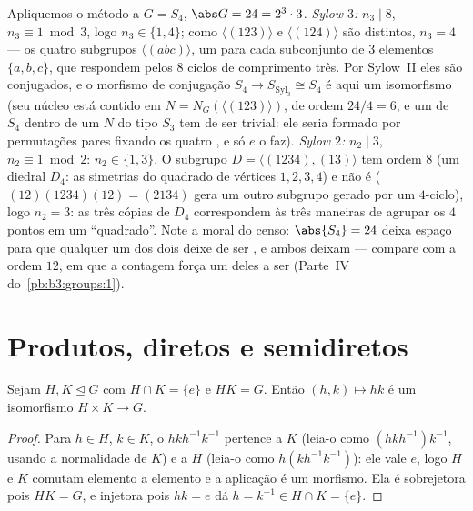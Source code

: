 \begin{example}
\label{ex:b3:groups:s4sylow}
Apliquemos o método a $G = S_4$, $\abs G = 24 = 2^3\cdot3$. \emph{Sylow $3$:} $n_3 \mid 8$, $n_3 \equiv 1 \bmod 3$,
logo $n_3
\in \{1, 4\}$; como $\langle(123)\rangle$ e $\langle(124)\rangle$ são distintos, $n_3 = 4$ --- os quatro
subgrupos $\langle(abc)\rangle$, um para cada subconjunto de $3$ elementos $\{a, b, c\}$,
que respondem pelos $8$ ciclos de comprimento três. Por
Sylow~II eles são conjugados, e o morfismo de conjugação $S_4 \to
S_{\mathrm{Syl}_3} \cong S_4$ é aqui
um isomorfismo (seu núcleo está contido em $N = N_G(\langle(123)\rangle)$, de ordem $24/4 =
6$, e um
 de $S_4$ dentro de um $N$ do tipo $S_3$ tem
de ser trivial: ele seria formado por permutações pares fixando os
quatro , e só $e$ o faz). \emph{Sylow $2$:}
$n_2 \mid 3$, $n_2
\equiv 1 \bmod 2$: $n_2 \in \{1, 3\}$. O subgrupo $D =
\langle(1234), (13)\rangle$ tem ordem $8$ (um diedral
$D_4$: as simetrias do quadrado de vértices $1, 2, 3, 4$) e não é 
($(12)(1234)(12) = (2134)$ gera um outro subgrupo gerado por um $4$-ciclo), logo $n_2 = 3$:
as três cópias de $D_4$ correspondem às três maneiras de agrupar os
$4$ pontos em um ``quadrado''. Note a moral do censo: $\abs{S_4} = 24$ deixa
espaço para que qualquer um dos dois  deixe de ser
, e ambos deixam --- compare com a ordem $12$, em que a
contagem força um deles a ser  (Parte~IV do~\cref{pb:b3:groups:1}).
\end{example}

\section{Produtos, diretos e semidiretos}

\begin{proposition}\label{prop:b3:groups:direct}
Sejam $H, K \trianglelefteq G$ com $H \cap K = \{e\}$ e $HK = G$. Então $(h,k) \mapsto hk$ é um isomorfismo
$H \times K \to
G$.
\end{proposition}

\begin{proof}
Para $h \in H$, $k \in K$, o  $hkh^{-1}k^{-1}$ pertence a $K$ (leia-o como
$(hkh^{-1})k^{-1}$, usando a normalidade de $K$) e a $H$ (leia-o como $h(kh^{-1}k^{-1})$):
ele vale $e$, logo $H$ e $K$ comutam elemento a elemento e
a aplicação é um morfismo. Ela é sobrejetora pois $HK = G$, e
injetora pois $hk = e$ dá $h = k^{-1} \in
H \cap K = \{e\}$.
\end{proof}

